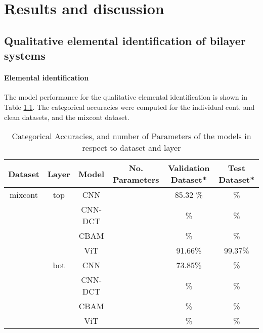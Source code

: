 

\chapter{Results and discussion} %

\label{Chapter4}



\section{Qualitative elemental identification of bilayer systems}
\subsubsection{Elemental identification}
The model performance for the qualitative elemental identification is shown in Table \ref{tab:acc_qual}. The categorical accuracies were computed for the individual cont. and clean datasets, and the mixcont dataset. 

\begin{table}[H]
    \centering
    \begin{tabular}{c|c|c|c|c|c}
        Dataset & Layer & Model   & No. Parameters & Validation Dataset*  & Test Dataset*    \\
        \hline
        mixcont & top   & CNN     &                & 85.32 \%              &        \% \\
                &       & CNN-DCT &                &       \%              &         \% \\
                &       & CBAM    &                &       \%              &         \% \\
                &       & ViT     &                &  91.66\%              &   99.37\% \\
                & bot   & CNN     &                &  73.85\%              &          \%  \\
                &       & CNN-DCT &                &       \%              &          \%  \\
                &       & CBAM    &                &       \%              &         \% \\
                &       & ViT     &                &       \%              &           \% \\
    \end{tabular}
    \caption{Categorical Accuracies, and number of Parameters of the models in respect to dataset and layer}
    \label{tab:acc_qual}
\end{table}



